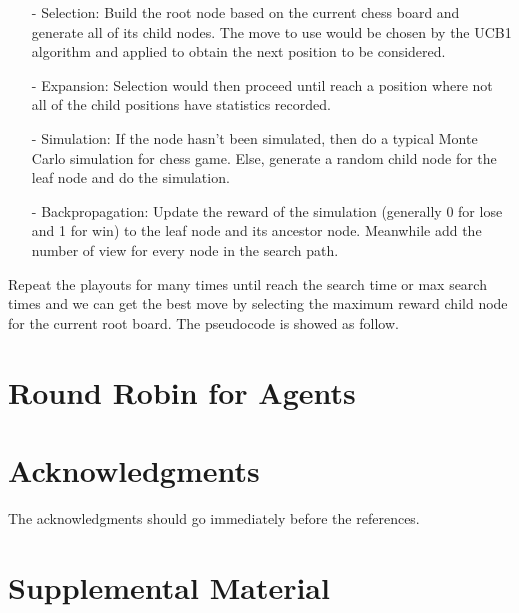 \documentclass[11pt,a4paper]{article}
\begin{document}
\begin{itemize}
\item[-] Selection:
Build the root node based on the current chess board and generate all of its child nodes. The move to use would be chosen by the UCB1 algorithm and applied to obtain the next position to be considered. 
\item[-] Expansion:
Selection would then proceed until reach a position where not all of the child positions have statistics recorded. 
\item[-] Simulation:
If the node hasn't been simulated, then do a typical Monte Carlo simulation for chess game. Else, generate a random child node for the leaf node and do the simulation.
\item[-] Backpropagation:
Update the reward of the simulation (generally 0 for lose and 1 for win) to the leaf node and its ancestor node. Meanwhile add the number of view for every node in the search path.
\end{itemize}
\par Repeat the playouts for many times until reach the search time or max search times and we can get the best move by selecting the maximum reward child node for the current root board. The pseudocode is showed as follow.


\section{Round Robin for Agents}

\section*{Acknowledgments}

The acknowledgments should go immediately before the references.




\appendix

\section{Supplemental Material}
\end{document}
